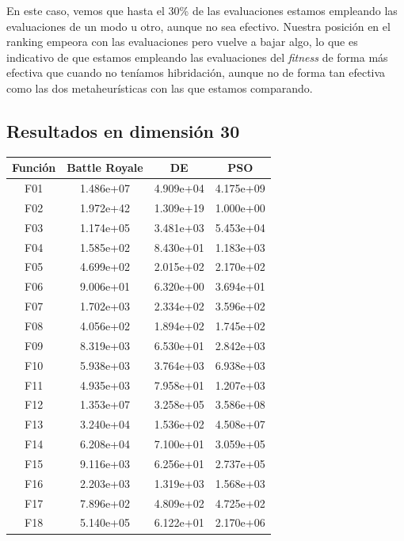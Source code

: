 \documentclass[11pt]{article}
\begin{document}
En este caso, vemos que hasta el 30\% de las evaluaciones estamos empleando las evaluaciones de un modo u otro, aunque no sea efectivo. Nuestra posición en el ranking empeora con las evaluaciones pero vuelve a bajar algo, lo que es indicativo de que estamos empleando las evaluaciones del \emph{fitness} de forma más efectiva que cuando no teníamos hibridación, aunque no de forma tan efectiva como las dos metaheurísticas con las que estamos comparando.

\subsection{Resultados en dimensión 30}

\begin{table}[H]
\centering
\begin{tabular}{|c|c|c|c|}
\hline
\textbf{Función} & \textbf{Battle Royale} &         \textbf{DE} &        \textbf{PSO} \\
\hline
F01  &     1.486e+07 &  4.909e+04 &  4.175e+09 \\
F02  &     1.972e+42 &  1.309e+19 &  1.000e+00 \\
F03  &     1.174e+05 &  3.481e+03 &  5.453e+04 \\
F04  &     1.585e+02 &  8.430e+01 &  1.183e+03 \\
F05  &     4.699e+02 &  2.015e+02 &  2.170e+02 \\
F06  &     9.006e+01 &  6.320e+00 &  3.694e+01 \\
F07  &     1.702e+03 &  2.334e+02 &  3.596e+02 \\
F08  &     4.056e+02 &  1.894e+02 &  1.745e+02 \\
F09  &     8.319e+03 &  6.530e+01 &  2.842e+03 \\
F10  &     5.938e+03 &  3.764e+03 &  6.938e+03 \\
F11  &     4.935e+03 &  7.958e+01 &  1.207e+03 \\
F12  &     1.353e+07 &  3.258e+05 &  3.586e+08 \\
F13  &     3.240e+04 &  1.536e+02 &  4.508e+07 \\
F14  &     6.208e+04 &  7.100e+01 &  3.059e+05 \\
F15  &     9.116e+03 &  6.256e+01 &  2.737e+05 \\
F16  &     2.203e+03 &  1.319e+03 &  1.568e+03 \\
F17  &     7.896e+02 &  4.809e+02 &  4.725e+02 \\
F18  &     5.140e+05 &  6.122e+01 &  2.170e+06 \\

\end{tabular}
\end{table}
\end{document}
